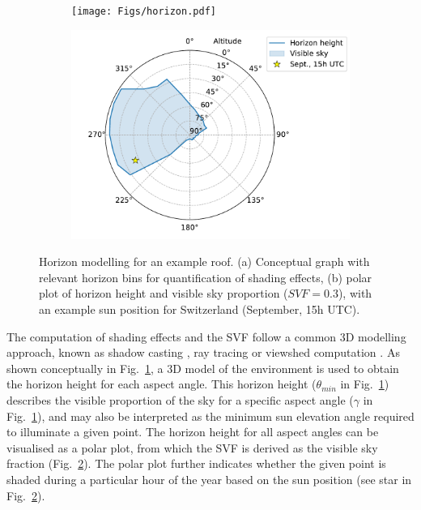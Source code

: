 \begin{figure}[b]
	\centering
	\begin{subfigure}[t]{.49\textwidth}
		\centering
		\texttt{[image: Figs/horizon.pdf]}  
		\subcaption{}
        \label{figa:horizon_method}
	\end{subfigure}
	\begin{subfigure}[t]{.49\textwidth}
		\centering
		\includegraphics[width=\linewidth]{images/Figs/skyview_point_w_star.pdf}  
		\subcaption{}
		\label{figb:horizon_method}
	\end{subfigure}
	\caption{Horizon modelling for an example roof. (a) Conceptual graph with relevant horizon bins for quantification of shading effects, (b) polar plot of horizon height and visible sky proportion ($\mathit{SVF} = 0.3$), with an example sun position for Switzerland (September, 15h UTC).}
	\label{fig:horizon_method}
\end{figure}

The computation of shading effects and the SVF follow a common 3D modelling approach, known as shadow casting \cite{levinson_solar_2009,desthieux_solar_2018}, ray tracing \cite{jakubiec_method_2013} or viewshed computation \cite{nguyen_incorporating_2012}. 
As shown conceptually in Fig.~\ref{figa:horizon_method}, a 3D model of the environment is used to obtain the horizon height for each aspect angle. 
%
This horizon height ($\theta_\mathit{min}$ in Fig.~\ref{figa:horizon_method}) describes the visible proportion of the sky for a specific aspect angle ($\gamma$ in Fig.~\ref{figa:horizon_method}), and may also be interpreted as the minimum sun elevation angle required to illuminate a given point. 
%
The horizon height for all aspect angles can be visualised as a polar plot, from which the SVF is derived as the visible sky fraction (Fig.~\ref{figb:horizon_method}). The polar plot further indicates whether the given point is shaded during a particular hour of the year based on the sun position (see star in Fig.~\ref{figb:horizon_method}).

